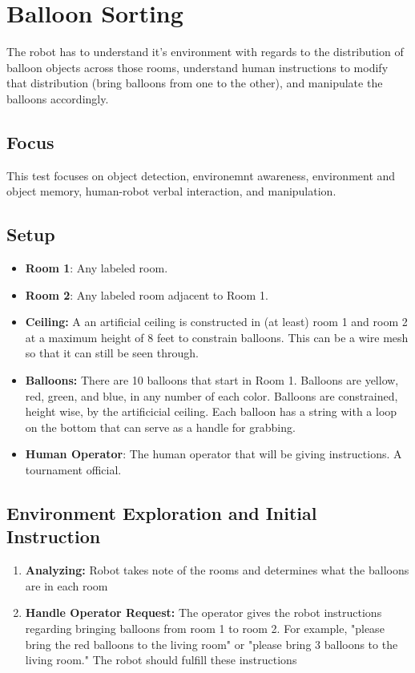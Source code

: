 \section{Balloon Sorting}

The robot has to understand it's environment with regards to the distribution of balloon objects across those rooms, understand human instructions to modify that distribution (bring balloons from one to the other), and manipulate the balloons accordingly.

\subsection{Focus}

This test focuses on object detection, environemnt awareness, environment and object memory, human-robot verbal interaction, and manipulation.

\subsection{Setup}
\begin{itemize}
	\item \textbf{Room 1}: Any labeled room.
	\item \textbf{Room 2}: Any labeled room adjacent to Room 1.
	\item \textbf {Ceiling:} A an artificial ceiling is constructed in (at least) room 1 and room 2 at a maximum height of 8 feet to constrain balloons.  This can be a wire mesh so that it can still be seen through.
	\item \textbf{Balloons:} There are 10 balloons that start in Room 1.  Balloons are yellow, red, green, and blue, in any number of each color.  Balloons are constrained, height wise, by the artificicial ceiling.  Each balloon has a string with a loop on the bottom that can serve as a handle for grabbing.
	\item \textbf{Human Operator}: The human operator that will be giving instructions.  A tournament official.
\end{itemize}

\subsection{Environment Exploration and Initial Instruction}

\begin{enumerate}

	\item \textbf{Analyzing:} Robot takes note of the rooms and determines what the balloons are in each room

	\item \textbf{Handle Operator Request:} The operator gives the robot instructions regarding bringing balloons from room 1 to room 2.  For example, "please bring the red balloons to the living room" or "please bring 3 balloons to the living room."  The robot should fulfill these instructions

\end{enumerate}


